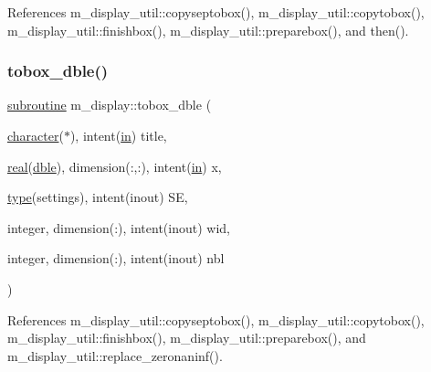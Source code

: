 References m\+\_\+display\+\_\+util\+::copyseptobox(), m\+\_\+display\+\_\+util\+::copytobox(), m\+\_\+display\+\_\+util\+::finishbox(), m\+\_\+display\+\_\+util\+::preparebox(), and then().

\mbox{\label{namespacem__display_abcff2aedbfe00eb52827b4941af59831}} 
\subsubsection{\texorpdfstring{tobox\+\_\+dble()}{tobox\_dble()}}
{\footnotesize\ttfamily \hyperlink{M__stopwatch_83_8txt_acfbcff50169d691ff02d4a123ed70482}{subroutine} m\+\_\+display\+::tobox\+\_\+dble (\begin{DoxyParamCaption}\item[{\hyperlink{option__stopwatch_83_8txt_abd4b21fbbd175834027b5224bfe97e66}{character}($\ast$), intent(\hyperlink{M__journal_83_8txt_afce72651d1eed785a2132bee863b2f38}{in})}]{title,  }\item[{\hyperlink{read__watch_83_8txt_abdb62bde002f38ef75f810d3a905a823}{real}(\hyperlink{namespacem__display_a46d90b75b6ccef7ccade133e5847e815}{dble}), dimension(\+:,\+:), intent(\hyperlink{M__journal_83_8txt_afce72651d1eed785a2132bee863b2f38}{in})}]{x,  }\item[{\hyperlink{stop__watch_83_8txt_a70f0ead91c32e25323c03265aa302c1c}{type}(settings), intent(inout)}]{SE,  }\item[{integer, dimension(\+:), intent(inout)}]{wid,  }\item[{integer, dimension(\+:), intent(inout)}]{nbl }\end{DoxyParamCaption})\hspace{0.3cm}{\ttfamily [private]}}



References m\+\_\+display\+\_\+util\+::copyseptobox(), m\+\_\+display\+\_\+util\+::copytobox(), m\+\_\+display\+\_\+util\+::finishbox(), m\+\_\+display\+\_\+util\+::preparebox(), and m\+\_\+display\+\_\+util\+::replace\+\_\+zeronaninf().

\mbox{\label{namespacem__display_a305dbf4f9072f9d1551a24c0f26ad508}} 
